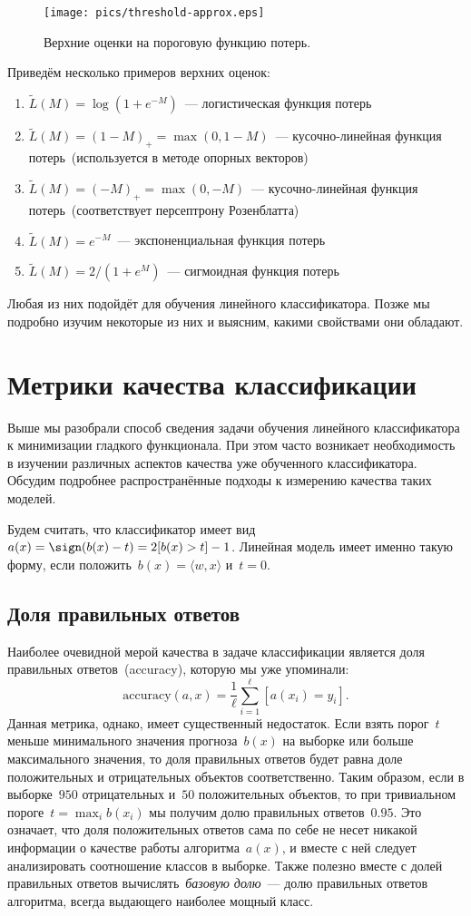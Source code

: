 \documentclass[12pt,fleqn]{article}
\begin{document}
\begin{figure}[t]
    \centering
    \texttt{[image: pics/threshold-approx.eps]}
    \caption{Верхние оценки на пороговую функцию потерь.}
    \label{fig:bounds}
\end{figure}

Приведём несколько примеров верхних оценок:
\begin{enumerate}
    \item $\tilde L(M) = \log \left(1 + e^{-M} \right)$~--- логистическая функция потерь
    \item $\tilde L(M) = (1 - M)_+ = \max(0, 1 - M)$~--- кусочно-линейная функция потерь~(используется в методе опорных векторов)
    \item $\tilde L(M) = (-M)_+ = \max(0, -M)$~--- кусочно-линейная функция потерь~(соответствует персептрону Розенблатта)
    \item $\tilde L(M) = e^{-M}$~--- экспоненциальная функция потерь
    \item $\tilde L(M) = 2/(1 + e^M)$~--- сигмоидная функция потерь
\end{enumerate}
Любая из них подойдёт для обучения линейного классификатора.
Позже мы подробно изучим некоторые из них и выясним, какими свойствами они обладают.

\section{Метрики качества классификации}
Выше мы разобрали способ сведения задачи обучения линейного классификатора
к минимизации гладкого функционала.
При этом часто возникает необходимость в изучении различных аспектов качества
уже обученного классификатора.
Обсудим подробнее распространённые подходы к измерению качества таких моделей.

Будем считать, что классификатор имеет вид $a(x) = \sign(b(x) - t) = 2 [b(x) > t] - 1$.
Линейная модель имеет именно такую форму, если положить~$b(x) = \langle w, x \rangle$ и~$t = 0$.

\subsection{Доля правильных ответов}
Наиболее очевидной мерой качества в задаче классификации является доля правильных ответов~(accuracy),
которую мы уже упоминали:
\[
    \text{accuracy}(a, x)
    =
    \frac{1}{\ell}
    \sum_{i = 1}^{\ell} [a(x_i) = y_i].
\]
Данная метрика, однако, имеет существенный недостаток.
Если взять порог~$t$ меньше минимального значения прогноза~$b(x)$ на выборке
или больше максимального значения, то доля правильных ответов будет равна
доле положительных и отрицательных объектов соответственно.
Таким образом, если в выборке~$950$ отрицательных
и~$50$ положительных объектов, то при тривиальном пороге~$t = \max_i b(x_i)$
мы получим долю правильных ответов~$0.95$.
Это означает, что доля положительных ответов сама по себе
не несет никакой информации о качестве работы алгоритма~$a(x)$,
и вместе с ней следует анализировать соотношение классов в выборке.
Также полезно вместе с долей правильных ответов вычислять~\emph{базовую долю}~---
долю правильных ответов алгоритма, всегда выдающего наиболее мощный класс.
\end{document}
